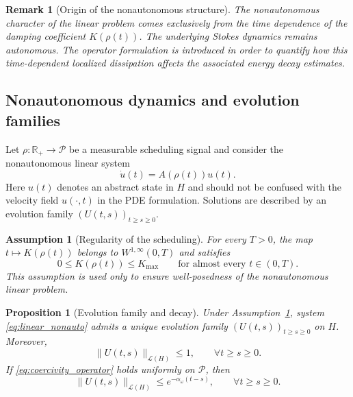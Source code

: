 \documentclass[preprint,12pt]{elsarticle}
\newtheorem{proposition}  [theorem]{Proposition}
\newtheorem{remark}[theorem]{Remark}
\newtheorem{assumption}[theorem]{Assumption}
\begin{document}
\begin{remark}[Origin of the nonautonomous structure]
The nonautonomous character of the linear problem comes exclusively from the
time dependence of the damping coefficient $K(\rho(t))$.
The underlying Stokes dynamics remains autonomous.
The operator formulation is introduced in order to quantify how this
time-dependent localized dissipation affects the associated energy decay
estimates.
\end{remark}

\subsection{Nonautonomous dynamics and evolution families}

Let $\rho:\mathbb R_+\to\mathcal P$ be a measurable scheduling signal and
consider the nonautonomous linear system
\begin{equation}
\label{eq:linear_nonauto}
\dot u(t)=A(\rho(t))u(t).
\end{equation}
Here $u(t)$ denotes an abstract state in $H$ and should not be confused with the
velocity field $u(\cdot,t)$ in the PDE formulation.
Solutions are described by an evolution family $(U(t,s))_{t\ge s\ge0}$.

\begin{assumption}[Regularity of the scheduling]
\label{ass:rho_reg}
For every $T>0$, the map $t\mapsto K(\rho(t))$ belongs to
$W^{1,\infty}(0,T)$ and satisfies
\[
0\le K(\rho(t))\le K_{\max}
\qquad \text{for almost every } t\in(0,T).
\]
This assumption is used only to ensure well-posedness of the nonautonomous
linear problem.
\end{assumption}

\begin{proposition}[Evolution family and decay]
\label{prop:evol_family}
Under Assumption~\ref{ass:rho_reg}, system \eqref{eq:linear_nonauto} admits a
unique evolution family $(U(t,s))_{t\ge s\ge0}$ on $H$.
Moreover,
\[
\|U(t,s)\|_{\mathcal L(H)}\le1,\qquad \forall t\ge s\ge0.
\]
If \eqref{eq:coercivity_operator} holds uniformly on $\mathcal P$, then
\[
\|U(t,s)\|_{\mathcal L(H)}\le e^{-\alpha_\omega(t-s)},
\qquad \forall t\ge s\ge0.
\]
\end{proposition}
\end{document}
